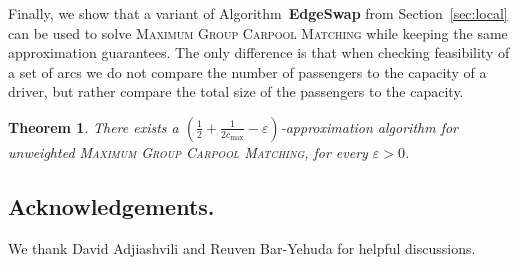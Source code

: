 \documentclass[11pt]{article}
\newtheorem{theorem}{Theorem}
\newcommand{\half}{\frac{1}{2}}
\newcommand{\inv}[1]{\frac{1}{#1}}
\newcommand{\gcp}{\textsc{Maximum Group Carpool Matching}\xspace}
\newcommand{\cmax}{c_{\max}}
\newcommand{\eps}{\varepsilon}
\begin{document}


Finally, we show that a variant of Algorithm~\textbf{EdgeSwap} from
Section~\ref{sec:local} can be used to solve \gcp while keeping the
same approximation guarantees. 
%
The only difference is that when checking feasibility of a set of arcs
we do not compare the number of passengers to the capacity of a
driver, but rather compare the total size of the passengers to the
capacity.

\begin{theorem}
There exists a $(\half + \inv{2\cmax} - \eps)$-approximation algorithm
for unweighted \gcp, for every $\eps>0$.
\end{theorem}


\subsection*{Acknowledgements.}

We thank David Adjiashvili and Reuven Bar-Yehuda for helpful
discussions.




\end{document}
